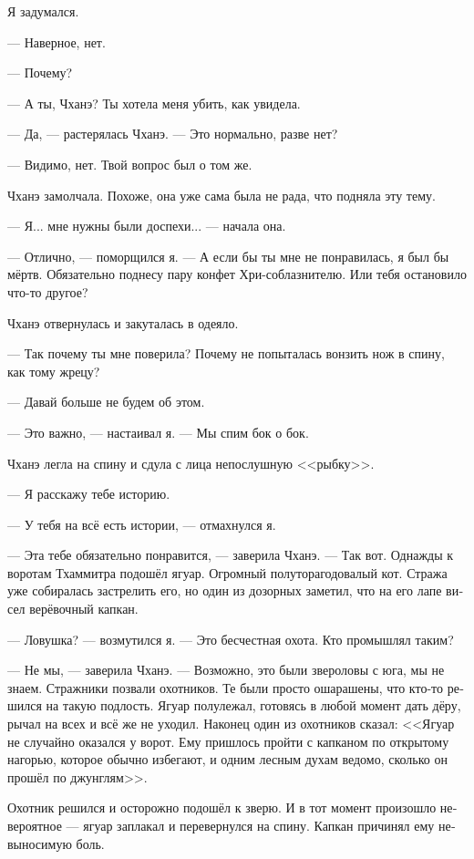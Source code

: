 \documentclass[a4paper,12pt,fleqn]{book}\usepackage{polyglossia}\setdefaultlanguage[babelshorthands=true]{russian}\setotherlanguage{english}\defaultfontfeatures{Ligatures=TeX,Mapping=tex-text}\usepackage{xcolor}\newcommand{\ml}[3]{#2}
\begin{document}
{Я задумался.

--- Наверное, нет.

--- Почему?

--- А ты, Чханэ?
Ты хотела меня убить, как увидела.

--- Да, --- растерялась Чханэ.
--- Это нормально, разве нет?

--- Видимо, нет.
Твой вопрос был о том же.

Чханэ замолчала.
Похоже, она уже сама была не рада, что подняла эту тему.

--- Я... мне нужны были доспехи... --- начала она.

--- Отлично, --- поморщился я.
--- А если бы ты мне не понравилась, я был бы мёртв.
Обязательно поднесу пару конфет Хри-соблазнителю.
Или тебя остановило что-то другое?

Чханэ отвернулась и закуталась в одеяло.

--- Так почему ты мне поверила?
Почему не попыталась вонзить нож в спину, как тому жрецу?

--- Давай больше не будем об этом.

--- Это важно, --- настаивал я.
--- Мы спим бок о бок.

Чханэ легла на спину и сдула с лица непослушную <<рыбку>>.

--- Я расскажу тебе историю.

--- У тебя на всё есть истории, --- отмахнулся я.

--- Эта тебе обязательно понравится, --- заверила Чханэ.
--- Так вот.
Однажды к воротам Тхаммитра подошёл ягуар.
Огромный полуторагодовалый кот.
Стража уже собиралась застрелить его, но один из дозорных заметил, что на его лапе висел верёвочный капкан.

--- Ловушка? --- возмутился я.
--- Это бесчестная охота.
Кто промышлял таким?

--- Не мы, --- заверила Чханэ.
--- Возможно, это были звероловы с юга, мы не знаем.
Стражники позвали охотников.
Те были просто ошарашены, что кто-то решился на такую подлость.
Ягуар полулежал, готовясь в любой момент дать дёру, рычал на всех и всё же не уходил.
Наконец один из охотников сказал: <<Ягуар не случайно оказался у ворот.
Ему пришлось пройти с капканом по открытому нагорью, которое обычно избегают, и одним лесным духам ведомо, сколько он прошёл по джунглям>>.

Охотник решился и осторожно подошёл к зверю.
И в тот момент произошло невероятное --- ягуар заплакал и перевернулся на спину.
Капкан причинял ему невыносимую боль.

}
\end{document}
